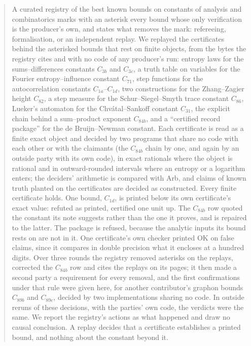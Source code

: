 \documentclass[preprint,11pt,authoryear,a4paper]{elsarticle}
\begin{document}
\begin{frontmatter}
\begin{abstract}
A curated registry of the best known bounds on \MtRgConstants{} constants of analysis and combinatorics marks with an asterisk every bound whose only verification is the producer's own, and states what removes the mark: refereeing, formalisation, or an independent replay. We replayed the certificates behind the asterisked bounds that rest on finite objects, from the bytes the registry cites and with no code of any producer's run: entropy laws for the sums--differences constants $C_{3b}$ and $C_{3c}$, a truth table on \MtRgFeiN{} variables for the Fourier entropy--influence constant $C_{71}$, step functions for the autocorrelation constants $C_{1a}$--$C_{1d}$, two constructions for the Zhang--Zagier height $C_{82}$, a step measure for the Schur--Siegel--Smyth trace constant $C_{86}$, Lueker's automaton for the Chv\'atal--Sankoff constant $C_{31}$, the explicit chain behind a sum--product exponent $C_{84b}$, and a ``certified record package'' for the de Bruijn--Newman constant. Each certificate is read as a finite exact object and decided by two programs that share no code with each other or with the claimants (the $C_{84b}$ chain by one, and again by an outside party with its own code), in exact rationals where the object is rational and in outward-rounded intervals where an entropy or a logarithm enters; the deciders' arithmetic is compared with Arb, and claims of known truth planted on the certificates are decided as constructed. Every finite certificate holds. One bound, $C_{1d}$, is printed below its own certificate's exact value: refuted as printed, certified one unit up. The $C_{84b}$ row quoted the constant its note suggests rather than the one it proves, and is repaired to the latter. The package is refused, because the analytic inputs its bound rests on are not in it. One certificate's own checker printed OK on false claims, since it compares in double precision what it encloses at a hundred digits. Over three rounds the registry removed \MtRgMarksTotalWord{} asterisks on the replays, corrected the $C_{84b}$ row and cites the replays on its pages; it then made a second party a requirement for every removal, and the first confirmations under that rule were given here, for another contributor's graphon bounds $C_{89b}$ and $C_{89c}$, decided by two implementations sharing no code. In \OcOutRuns{} outside reruns of these decisions, \OcOutOwn{} with the parties' own code, the verdicts were the same. We report the registry's actions as what happened and draw no causal conclusion. A replay decides that a certificate establishes a printed bound, and nothing about the constant beyond it.
\end{abstract}


\end{frontmatter}
\end{document}
